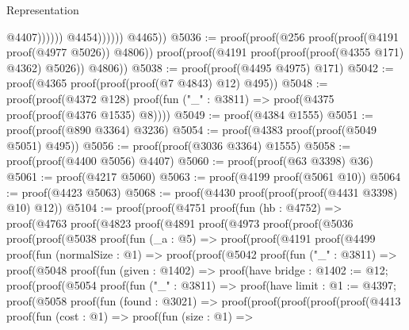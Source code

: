 \begin{lexlean}{Representation}
\begin{coremodule}
                                        @4407))))))
                        @4454))))))
        @4465))
@5036 := proof(proof(@256 proof(proof(@4191 proof(@4977 @5026)) @4806))
      proof(proof(@4191 proof(proof(proof(@4355 @171) @4362) @5026)) @4806))
@5038 := proof(proof(@4495 @4975) @171)
@5042 := proof(@4365 proof(proof(proof(@7 @4843) @12) @495))
@5048 := proof(proof(@4372 @128)
      proof(fun ("_" : @3811) => proof(@4375 proof(proof(@4376 @1535) @8))))
@5049 := proof(@4384 @1555)
@5051 := proof(proof(@890 @3364) @3236)
@5054 := proof(@4383 proof(proof(@5049 @5051) @495))
@5056 := proof(proof(@3036 @3364) @1555)
@5058 := proof(proof(@4400 @5056) @4407)
@5060 := proof(proof(@63 @3398) @36)
@5061 := proof(@4217 @5060)
@5063 := proof(@4199 proof(@5061 @10))
@5064 := proof(@4423 @5063)
@5068 := proof(@4430 proof(proof(proof(@4431 @3398) @10) @12))
@5104 := proof(proof(@4751
        proof(fun (hb : @4752) =>
          proof(@4763
              proof(@4823
                  proof(@4891
                      proof(@4973
                          proof(proof(@5036
                                proof(proof(@5038
                                      proof(fun (_a : @5) =>
                                        proof(proof(@4191
                                              proof(@4499
                                                  proof(fun (normalSize : @1) =>
                                                    proof(proof(@5042
                                                          proof(fun ("_" : @3811) =>
                                                            proof(@5048
                                                                proof(fun (given : @1402) =>
                                                                  proof(have bridge : @1402 := @12;
                                                                    proof(proof(@5054
                                                                          proof(fun ("_" : @3811) =>
                                                                            proof(have limit : @1 := @4397;
                                                                              proof(@5058
                                                                                  proof(fun (found : @3021) =>
                                                                                    proof(proof(proof(proof(proof(@4413
                                                                                                proof(fun (cost : @1) =>
                                                                                                  proof(fun (size : @1) =>

\end{coremodule}
\end{lexlean}
